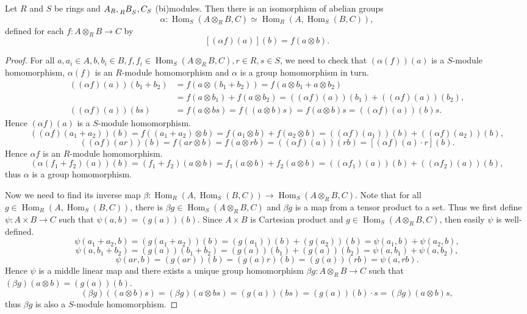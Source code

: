 \documentclass{article}
\DeclareMathOperator{\Hom}{Hom}
\begin{document}
\begin{theorem}
    Let $R $ and $S$ be rings and $A_R,\tensor[_R]{B}{_S},C_S$ (bi)modules. Then there is an isomorphism of abelian groups
    \begin{equation*}
        \alpha: \Hom_{S}(A \otimes_R B, C) \simeq \Hom_{R}(A, \Hom_{S}(B, C)),
    \end{equation*}
    defined for each $f:A \otimes_R B\to C$ by $$[(\alpha f)(a)](b)=f(a \otimes b).$$
\end{theorem}
\begin{proof}
    For all $a, a_{i} \in A, b, b_{i} \in B, f,f_{i} \in \Hom_{S}(A\otimes_R B, C),r \in R, s \in S$, we need to check that $(\alpha(f))(a)$ is a $S$-module homomorphism, $\alpha(f)$ is an $R$-module homomorphism and $\alpha$ is a group homomorphism in turn.
    \begin{equation*}
        \begin{aligned}
        ((\alpha f)(a))(b_{1}+b_{2}) &=f(a\otimes(b_{1}+b_{2}))=f(a\otimes b_{1}+a\otimes b_{2}) \\
        & =f(a\otimes b_{1})+f(a\otimes b_{2})=((\alpha f)(a))(b_{1})+((\alpha f)(a))(b_{2}), \\
        ((\alpha f)(a))(bs) &= f(a\otimes bs)=f((a \otimes b )s)=f(a \otimes b)s=((\alpha f)(a))(b)s.
        \end{aligned}
    \end{equation*}
    Hence $(\alpha f)(a)$ is a $S$-module homomorphism.
    $$        ((\alpha f)(a_{1}+a_{2}))(b) = f((a_{1}+a_{2})\otimes b)=f(a_{1} \otimes b)+f(a_{2} \otimes b)=((\alpha f)(a_{1}))(b)+((\alpha f)(a_{2}))(b),$$ 
    $$        ((\alpha f)(ar))(b) = f(ar \otimes b)=f(a \otimes rb)=((\alpha f)(a))(rb)=[(\alpha f)(a)\cdot r](b).$$
    Hence $\alpha f$ is an $R$-module homomorphism.
    \begin{equation*}
        (\alpha (f_{1}+f_{2})(a))(b)=(f_{1}+f_{2})(a \otimes b)=f_{1}(a \otimes b) + f_{2}(a \otimes b)=((\alpha f_{1})(a))(b)+ ((\alpha f_{2})(a))(b),
    \end{equation*}
    thus $\alpha$ is a group homomorphism.

    Now we need to find its inverse map $\beta:\Hom_{R}(A, \Hom_{S}(B, C)) \to\Hom_{S}(A \otimes_R B, C) $. Note that for all $g \in \Hom_{R}(A, \Hom_{S}(B, C))$, there is $\beta g \in \Hom_{S}(A\otimes_R B, C)$ and $\beta g$ is a map from a tensor product to a set. Thus we first define $\psi:A\times B \to C$ such that $\psi (a,b)=(g(a))(b)$. Since $A\times B$ is Cartesian product and $g \in \Hom_{S}(A\otimes_R B, C)$, then easily $\psi$ is well-defined.
    $$\psi(a_{1}+a_{2},b)=(g(a_{1}+a_{2}))(b)=(g(a_{1}))(b)+(g(a_{2}))(b)=\psi(a_{1},b)+\psi(a_{2},b),$$
    $$\psi(a,b_{1}+b_{2})=(g(a))(b_{1}+b_{2})=(g(a))(b_{1})+(g(a))(b_{2})=\psi(a,b_{1})+\psi(a,b_{2}),$$
    $$\psi(ar,b)=(g(ar))(b)=(g(a)r)(b)=(g(a))(rb)=\psi(a,rb).$$
    Hence $\psi$ is a middle linear map and there exists a unique group homomorphism $\beta g:A \otimes_R B\to C$ such that $(\beta g)(a \otimes b)=(g(a))(b)$.
    $$(\beta g)((a\otimes b)s)=(\beta g)(a \otimes bs)=(g(a))(bs)=(g(a))(b)\cdot s=(\beta g)(a \otimes b)s,$$
    thus $\beta g$ is also a $S$-module homomorphism.
    

\end{proof}
\end{document}
